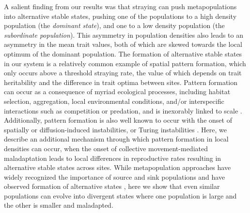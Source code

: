 \documentclass[twocolumn,preprintnumbers,amsmath,amssymb,superscriptaddress]{revtex4}
\begin{document}
% 
% 

A salient finding from our results was that straying can push metapopulations into alternative stable states, pushing one of the populations to a high density population (the \emph{dominant state}), and one to a low density population (the \emph{subordinate population}).
This asymmetry in population densities also leads to an asymmetry in the mean trait values, both of which are skewed towards the local optimum of the dominant population. 
The formation of alternative stable states in our system is a relatively common example of spatial pattern formation, which only occurs above a threshold straying rate, the value of which depends on trait heritability and the difference in trait optima between sites.
Pattern formation can occur as a consequence of myriad ecological processes, including habitat selection, aggregation, local environmental conditions, and/or interspecific interactions such as competition or predation, and is inexorably linked to scale \cite{Levin:1992p1472}. 
Additionally, pattern formation is also well known to occur with the onset of spatially or diffusion-induced instabilities, or Turing instabilities \cite{Meinhardt:2012hw}. 
Here, we describe an additional mechanism through which pattern formation in local densities can occur, when the onset of collective movement-mediated maladaptation leads to local differences in reproductive rates resulting in alternative stable states across sites. 
While metapopulation approaches have widely recognized the importance of source and sink populations \cite{Hanski:1999vu} and have observed formation of alternative states \cite{Boughton:1999fa}, here we show that even similar populations can evolve into divergent states where one population is large and the other is smaller and maladapted.
\end{document}
